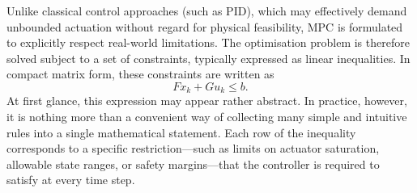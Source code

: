 Unlike classical control approaches (such as PID), which may effectively demand unbounded actuation without regard for physical feasibility, MPC is formulated to explicitly respect real-world limitations. The optimisation problem is therefore solved subject to a set of constraints, typically expressed as linear inequalities. In compact matrix form, these constraints are written as
\begin{equation}
	F x_k + G u_k \leq b .
\end{equation}
At first glance, this expression may appear rather abstract. In practice, however, it is nothing more than a convenient way of collecting many simple and intuitive rules into a single mathematical statement. Each row of the inequality corresponds to a specific restriction—such as limits on actuator saturation, allowable state ranges, or safety margins—that the controller is required to satisfy at every time step.


